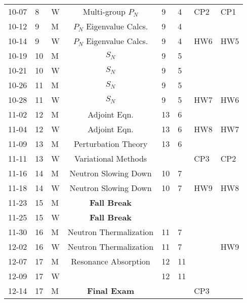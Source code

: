 \documentclass[11pt, a4paper]{article}
\begin{document}
\begin{table}[h]
\begin{center}
\begin{tabular}{lllcllll}
10-07 & 8 & W & Multi-group $P_N$ & 9 & 4 & CP2 & CP1\\
10-12 & 9 & M & $P_N$ Eigenvalue Calcs.& 9 & 4 &  &   \\
10-14 & 9 & W & $P_N$ Eigenvalue Calcs. & 9 & 4 & HW6 & HW5\\
10-19 & 10 & M & $S_N$ & 9 & 5 &  & \\
10-21 & 10 & W & $S_N$ & 9 & 5 &  & \\
10-26 & 11 & M & $S_N$ & 9 & 5 &     &    \\
10-28 & 11 & W & $S_N$ & 9 & 5 & HW7 & HW6 \\
11-02 & 12 & M & Adjoint Eqn. & 13 & 6 &  & \\
11-04 & 12 & W & Adjoint Eqn. & 13 & 6 & HW8 & HW7\\
11-09 & 13 & M & Perturbation Theory & 13 & 6 & & \\
11-11 & 13 & W & Variational Methods &  &  & CP3 & CP2\\
11-16 & 14 & M & Neutron Slowing Down & 10 &7 &  & \\
11-18 & 14 & W & Neutron Slowing Down & 10 & 7 & HW9 & HW8\\
11-23 & 15 & M & \textbf{Fall Break} &  &  &  & \\
11-25 & 15 & W & \textbf{Fall Break} &  &  &  &  \\
11-30 & 16 & M & Neutron Thermalization &  11 & 7 &  & \\
12-02 & 16 & W & Neutron Thermalization & 11 & 7 &  & HW9\\
12-07 & 17 & M & Resonance Absorption & 12 & 11 &  & \\
12-09 & 17 & W &  & 12 & 11 &  & \\
12-14 & 17 & M & \textbf{Final Exam} &  &  & CP3 & \\
\end{tabular}
\end{center}
\end{table}
\end{document}
